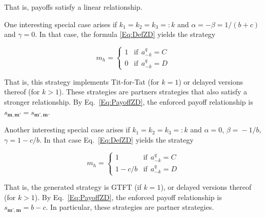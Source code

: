 \documentclass{article}
\theoremstyle{definition}
\begin{document}
That is, payoffs satisfy a linear relationship. 

One interesting special case arises if $k_1\!=\!k_2\!=\!k_3\!=:\!k$ and $\alpha
= -\beta =1/(b\!+\!c)$ and $\gamma=0$. In that case, the formula
\eqref{Eq:DefZD} yields the strategy

\begin{equation}
m_h = \left\{
\begin{array}{ll}
1	&\text{if}~~a^q_{-k}=C\\
0	&\text{if}~~a^q_{-k}=D
\end{array}
\right.
\end{equation}

That is, this strategy implements Tit-for-Tat (for $k\!=\!1$) or delayed
versions thereof (for $k\!>\!1$). These strategies are partners strategies that
also satisfy a stronger relationship. By Eq.~\eqref{Eq:PayoffZD}, the enforced
payoff relationship is $s_{\mathbf{m}, \mathbf{m'}}\!=\! s_{\mathbf{m'},
\mathbf{m}}$.

Another interesting special case arises if  $k_1\!=\!k_2\!=\!k_3\!=:\!k$ and
$\alpha\!=\!0$, $\beta\!=\!-1/b$, $\gamma\!=\!1\!-\!c/b$. In that case
Eq.~\eqref{Eq:DefZD} yields the strategy

\begin{equation}
m_h = \left\{
\begin{array}{ll}
1	&\text{if}~~a^q_{-k}=C\\
1-c/b	&\text{if}~~a^q_{-k}=D
\end{array}
\right.
\end{equation}

That is, the generated strategy is GTFT (if $k\!=\!1$), or delayed versions
thereof (for $k\!>\!1$). By Eq.~\eqref{Eq:PayoffZD}, the enforced payoff
relationship is $s_{\mathbf{m'}, \mathbf{m}}\!=\!b\!-\!c$. In particular, these
strategies are partner strategies.\\



\end{document}
